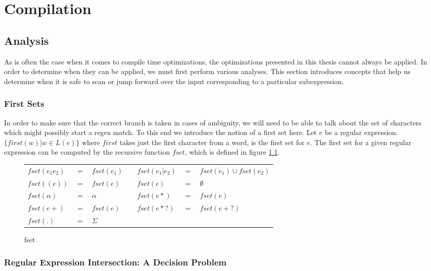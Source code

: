 \chapter{Compilation}
\label{chapter:compilation}

\section{Analysis}

As is often the case when it comes to compile time optimizations,
the optimizations presented in this thesis cannot always be
applied. In order to determine when they can be applied, we must
first perform various analyses. This section introduces concepts
that help us determine when it is safe to scan or jump forward over the
input corresponding to a particular subexpression.

\subsection{First Sets}

In order to make sure that the correct branch is taken in cases of
ambiguity, we will need to be able to talk about the set of characters
which might possibly start a regex match. To this end we introduce the
notion of a first set here. Let $e$ be a regular expression.
$\{first(w) \rvert w \in L(e)\}$ where $first$ takes just the first character
from a word, is the first set for $e$. The first set for a given
regular expression can be computed by the recursive function $fset$,
which is defined in figure \ref{fig:fsetdef}.

\begin{figure}
\label{fig:fsetdef}
\caption{fset}
\begin{tabular}{l c l c l c l}
$fset(e_1 e_2)$ & $=$ & $fset(e_1)$ & &
  $fset(e_1 \rvert e_2)$ & $=$ & $fset(e_1) \cup fset(e_2)$ \\
$fset((e))$ & $=$ & $fset(e)$ & &
  $fset(\epsilon)$ & $=$ & $\emptyset$ \\
$fset(\alpha)$ & $=$ & $\alpha$ & &
  $fset(e*)$ & $=$ & $fset(e)$ \\
$fset(e+)$ & $=$ & $fset(e)$ & &
  $fset(e*?)$ & $=$ & $fset(e+?)$ \\
$fset(.)$ & $=$ & $\Sigma$ & & & & \\
\end{tabular}
\end{figure}

\subsection{Regular Expression Intersection: A Decision Problem}

